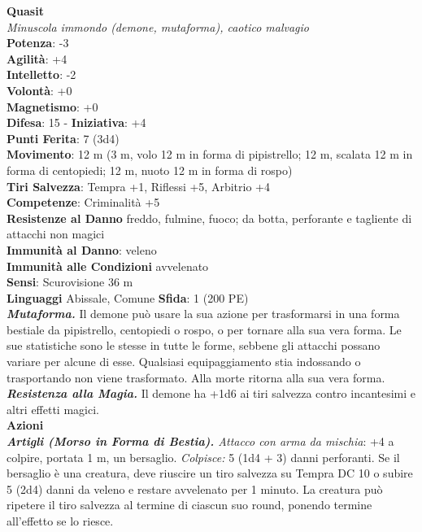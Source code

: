 \begin{multicols}{2}
\medskip\textbf{Quasit}\\
\emph{Minuscola immondo (demone, mutaforma), caotico malvagio}\\
\textbf{Potenza}: -3\\
\textbf{Agilità}: +4\\
\textbf{Intelletto}: -2\\
\textbf{Volontà}: +0\\
\textbf{Magnetismo}: +0\\
\textbf{Difesa}: 15 - \textbf{Iniziativa}: +4\\
\textbf{Punti Ferita}: 7 (3d4)\\
\textbf{Movimento}: 12 m (3 m, volo 12 m in forma di pipistrello; 12 m,
scalata 12 m in forma di centopiedi; 12 m, nuoto 12 m in forma di rospo)\\
\textbf{Tiri Salvezza}: Tempra +1, Riflessi +5, Arbitrio +4\\
\textbf{Competenze}: Criminalità +5\\
\textbf{Resistenze al Danno} freddo, fulmine, fuoco; da botta, perforante e tagliente di attacchi non magici\\
\textbf{Immunità al Danno}: veleno\\
\textbf{Immunità alle Condizioni} avvelenato\\
\textbf{Sensi}: Scurovisione 36 m \\
\textbf{Linguaggi} Abissale, Comune 
\textbf{Sfida}: 1 (200 PE)\smallskip\\
\emph{\textbf{Mutaforma.}} Il demone può usare la sua azione per trasformarsi in una forma bestiale da pipistrello, centopiedi o rospo, o per tornare alla sua vera forma. Le sue statistiche sono le stesse in tutte le forme, sebbene gli attacchi possano variare per alcune di esse. Qualsiasi equipaggiamento stia indossando o trasportando non viene trasformato. Alla morte ritorna alla sua vera forma.\\
\emph{\textbf{Resistenza alla Magia.}} Il demone ha +1d6 ai tiri salvezza contro incantesimi e altri effetti magici.\\
\smallskip\textbf{Azioni}\\
\emph{\textbf{Artigli (Morso in Forma di Bestia).} Attacco con arma da mischia}: +4 a colpire, portata 1 m, un bersaglio. \emph{Colpisce:} 5 (1d4 + 3) danni perforanti. Se il bersaglio è una creatura, deve riuscire un tiro salvezza su Tempra DC 10 o subire 5 (2d4) danni da veleno e restare avvelenato per 1 minuto. La creatura può ripetere il tiro salvezza al termine di ciascun suo round, ponendo termine all'effetto se lo riesce.\\

\end{multicols}
